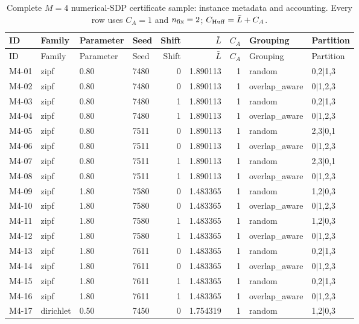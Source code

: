 \begin{longtable}{@{}llllrrrll@{}}
\caption{Complete $M=4$ numerical-SDP certificate sample: instance metadata and accounting. Every row uses $C_A=1$ and $n_{\rm fix}=2$; $C_{\rm Huff}=\bar L+C_A$.}\label{tab:supp-m4-meta}\\
\toprule
ID & Family & Parameter & Seed & Shift & $\bar L$ & $C_A$ & Grouping & Partition\\
\midrule
\endfirsthead
\toprule
ID & Family & Parameter & Seed & Shift & $\bar L$ & $C_A$ & Grouping & Partition\\
\midrule
\endhead
M4-01 & zipf & 0.80 & 7480 & 0 & 1.890113 & 1 & random & 0,2$\vert$1,3\\
M4-02 & zipf & 0.80 & 7480 & 0 & 1.890113 & 1 & overlap\_aware & 0$\vert$1,2,3\\
M4-03 & zipf & 0.80 & 7480 & 1 & 1.890113 & 1 & random & 0,2$\vert$1,3\\
M4-04 & zipf & 0.80 & 7480 & 1 & 1.890113 & 1 & overlap\_aware & 0$\vert$1,2,3\\
M4-05 & zipf & 0.80 & 7511 & 0 & 1.890113 & 1 & random & 2,3$\vert$0,1\\
M4-06 & zipf & 0.80 & 7511 & 0 & 1.890113 & 1 & overlap\_aware & 0$\vert$1,2,3\\
M4-07 & zipf & 0.80 & 7511 & 1 & 1.890113 & 1 & random & 2,3$\vert$0,1\\
M4-08 & zipf & 0.80 & 7511 & 1 & 1.890113 & 1 & overlap\_aware & 0$\vert$1,2,3\\
M4-09 & zipf & 1.80 & 7580 & 0 & 1.483365 & 1 & random & 1,2$\vert$0,3\\
M4-10 & zipf & 1.80 & 7580 & 0 & 1.483365 & 1 & overlap\_aware & 0$\vert$1,2,3\\
M4-11 & zipf & 1.80 & 7580 & 1 & 1.483365 & 1 & random & 1,2$\vert$0,3\\
M4-12 & zipf & 1.80 & 7580 & 1 & 1.483365 & 1 & overlap\_aware & 0$\vert$1,2,3\\
M4-13 & zipf & 1.80 & 7611 & 0 & 1.483365 & 1 & random & 0,2$\vert$1,3\\
M4-14 & zipf & 1.80 & 7611 & 0 & 1.483365 & 1 & overlap\_aware & 0$\vert$1,2,3\\
M4-15 & zipf & 1.80 & 7611 & 1 & 1.483365 & 1 & random & 0,2$\vert$1,3\\
M4-16 & zipf & 1.80 & 7611 & 1 & 1.483365 & 1 & overlap\_aware & 0$\vert$1,2,3\\
M4-17 & dirichlet & 0.50 & 7450 & 0 & 1.754319 & 1 & random & 1,2$\vert$0,3\\

\end{longtable}
